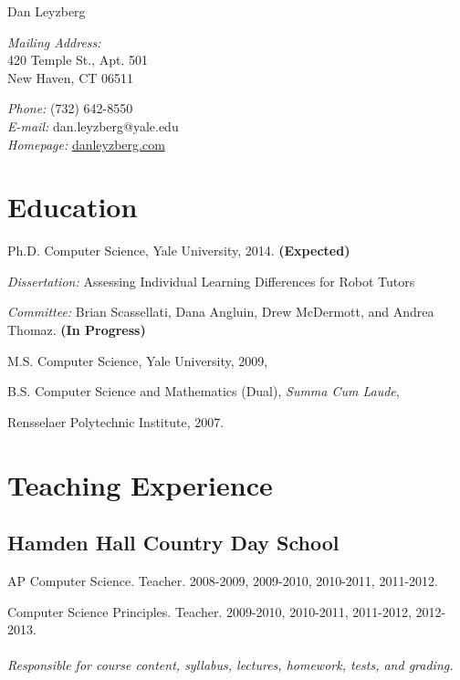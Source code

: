 \documentclass[10pt,letterpaper]{article}
\def\name{Dan Leyzberg}
\renewenvironment{itemize}{
  \begin{list}{}{
    \setlength{\leftmargin}{1.5em}
    \setlength{\itemsep}{0.25em}
    \setlength{\parskip}{0pt}
    \setlength{\parsep}{0.25em}
  }
}{
  \end{list}
}
\begin{document}
{\huge \name}


\bigskip

\begin{minipage}[t]{0.5\textwidth}
  \textit{Mailing Address:} \\
  420 Temple St., Apt. 501\\
  New Haven, CT 06511
\end{minipage}
\begin{minipage}[t]{0.5\textwidth}
  \textit{Phone:} (732) 642-8550 \\
  \textit{E-mail:} dan.leyzberg@yale.edu \\
  \textit{Homepage:} \href{http://www.danleyzberg.com}{danleyzberg.com}
\end{minipage}

\section*{Education}

\begin{itemize}
  \item Ph.D. Computer Science, Yale University, 2014. \textbf{(Expected)}
    \begin{itemize}
    \item \textit{Dissertation:}
      Assessing Individual Learning Differences for Robot Tutors
    \item \textit{Committee:}
      Brian Scassellati, Dana Angluin,
      Drew McDermott, and Andrea Thomaz. \textbf{(In Progress)}
    \end{itemize}
  \item M.S. Computer Science, Yale University, 2009,
  \item B.S. Computer Science and Mathematics (Dual), \textit{Summa Cum Laude},
    \begin{itemize}
    \item Rensselaer Polytechnic Institute, 2007.
    \end{itemize}
\end{itemize}

\section*{Teaching Experience}

\subsection*{Hamden Hall Country Day School}
\begin{itemize}
\item AP Computer Science. Teacher. 2008-2009, 2009-2010, 2010-2011, 2011-2012.
\item Computer Science Principles. Teacher. 2009-2010, 2010-2011, 2011-2012, 2012-2013.
\\ \\ {\it Responsible for course content, syllabus, lectures, homework, tests, and grading.}
\end{itemize}
\end{document}
